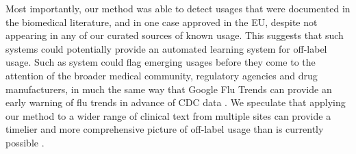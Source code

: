 Most importantly, our method was able to detect usages that were
documented in the biomedical literature, and in one case approved in
the EU, despite not appearing in any of our curated sources of known
usage.  This suggests that such systems could potentially provide an
automated learning system for off-label usage.  Such as system could
flag emerging usages before they come to the attention of the broader
medical community, regulatory agencies and drug manufacturers, in much
the same way that Google Flu Trends can provide an early warning of
flu trends in advance of CDC data \cite{Ginsberg2009}.  We speculate
that applying our method to a wider range of clinical text from
multiple sites can provide a timelier and more comprehensive picture
of off-label usage than is currently possible
\cite{Halevy2009,Banko2001}.

